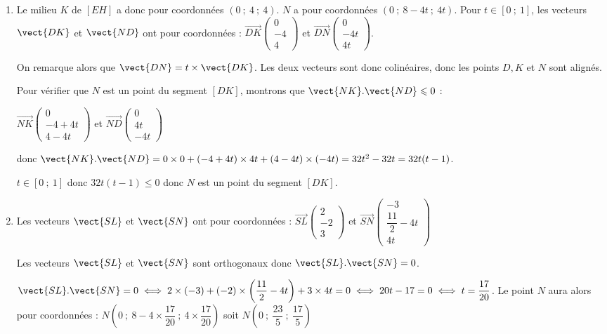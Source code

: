 \begin{enumerate}
\begin{enumerate}
Donc $x=3+2k=5$, $y =\dfrac52-2k=\dfrac12$ et $z=3k=3$.
Le point $L$ a pour coordonnées $\left(5~;~\dfrac12~;~3\right)$.
	\end{enumerate}
	\item Le milieu $K$ de $[EH]$ a donc pour coordonnées $\left(0~;~4~;~4\right)$. $N$ a pour coordonnées $(0~;~8 - 4t~;~4t)$. Pour $t\in [0~;~1]$, les vecteurs $\vect{DK}$ et $\vect{ND}$ ont pour coordonnées  : \(\overrightarrow{DK}\begin{pmatrix}0\\-4\\4\end{pmatrix}\) et \(\overrightarrow{DN}\begin{pmatrix}0\\-4t\\4t\end{pmatrix}\).
	
	On remarque alors que $\vect{DN}=t\times \vect{DK}$. Les deux vecteurs sont donc colinéaires, donc les points $D, K$ et $N$ sont alignés.
	
	Pour vérifier que $N$ est un point du segment $[DK]$, montrons que $\vect{NK}.\vect{ND}\leqslant 0$ :
	
	\(\overrightarrow{NK}\begin{pmatrix}0\\-4+4t\\4-4t\end{pmatrix}\) et \(\overrightarrow{ND}\begin{pmatrix}0\\4t\\-4t\end{pmatrix}\) 
	
	donc $\vect{NK}.\vect{ND}=0\times 0+(-4+4t)\times 4t+(4-4t)\times (-4t) =32t^2-32t =32t(t-1)$.
	
	$t\in [0~;~1]$ donc $32t(t-1)\leqslant 0$ donc $N$ est un point du segment $[DK]$.
	\item Les vecteurs $\vect{SL}$ et $\vect{SN}$ ont pour coordonnées : \(\overrightarrow{SL}\begin{pmatrix}2\\-2\\3\end{pmatrix}\) et \(\overrightarrow{SN}\begin{pmatrix}-3\\\dfrac{11}{2}-4t\\4t\end{pmatrix}\)
	
Les vecteurs $\vect{SL}$ et $\vect{SN}$ sont orthogonaux donc $\vect{SL}.\vect{SN}=0$.
	
	$\vect{SL}.\vect{SN}=0 \iff 2\times(-3)+(-2)\times \left(\dfrac{11}{2}-4t\right)+3\times 4t=0 \iff 20t-17=0 \iff t=\dfrac{17}{20}$.
	Le point $N$ aura alors pour coordonnées : $N\left(0~;~8-4\times\dfrac{17}{20}~;~4\times \dfrac{17}{20} \right)$ soit $N\left(0~;~\dfrac{23}{5}~;~\dfrac{17}{5} \right)$
	\end{enumerate}

\bigskip
